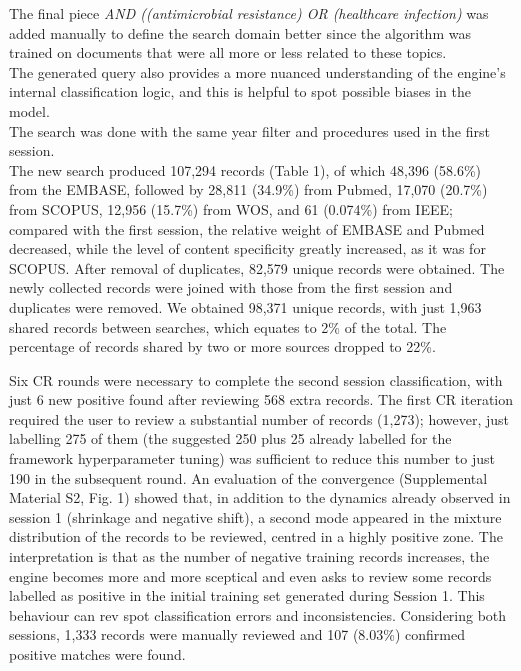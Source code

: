 \documentclass{article}
\begin{document}
The final piece \emph{AND ((antimicrobial resistance) OR (healthcare
infection)} was added manually to define the search domain better since
the algorithm was trained on documents that were all more or less
related to these topics.\\
The generated query also provides a more nuanced understanding of the
engine's internal classification logic, and this is helpful to spot
possible biases in the model.\\

The search was done with the same year filter and procedures used in the
first session.\\

The new search produced 107,294 records (Table 1), of which 48,396
(58.6\%) from the EMBASE, followed by 28,811 (34.9\%) from Pubmed,
17,070 (20.7\%) from SCOPUS, 12,956 (15.7\%) from WOS, and 61 (0.074\%)
from IEEE; compared with the first session, the relative weight of
EMBASE and Pubmed decreased, while the level of content specificity
greatly increased, as it was for SCOPUS. After removal of duplicates,
82,579 unique records were obtained. The newly collected records were
joined with those from the first session and duplicates were removed. We
obtained 98,371 unique records, with just 1,963 shared records between
searches, which equates to 2\% of the total. The percentage of records
shared by two or more sources dropped to 22\%.

Six CR rounds were necessary to complete the second session
classification, with just 6 new positive found after reviewing 568 extra
records. The first CR iteration required the user to review a
substantial number of records (1,273); however, just labelling 275 of
them (the suggested 250 plus 25 already labelled for the framework
hyperparameter tuning) was sufficient to reduce this number to just 190
in the subsequent round. An evaluation of the convergence (Supplemental
Material S2, Fig. 1) showed that, in addition to the dynamics already
observed in session 1 (shrinkage and negative shift), a second mode
appeared in the mixture distribution of the records to be reviewed,
centred in a highly positive zone. The interpretation is that as the
number of negative training records increases, the engine becomes more
and more sceptical and even asks to review some records labelled as
positive in the initial training set generated during Session 1. This
behaviour can rev spot classification errors and inconsistencies.
Considering both sessions, 1,333 records were manually reviewed and 107
(8.03\%) confirmed positive matches were found.
\end{document}

